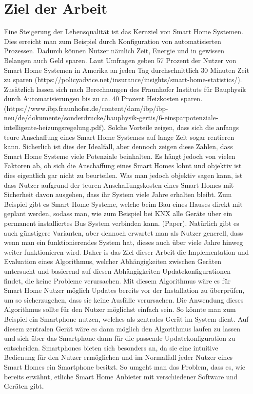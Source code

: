 \section{Ziel der Arbeit}


Eine Steigerung der Lebensqualität ist das Kernziel von Smart Home Systemen. Dies erreicht man zum Beispiel durch Konfiguration von 
automatisierten Prozessen. Dadurch können Nutzer nämlich Zeit, Energie und in gewissen Belangen auch Geld sparen. Laut Umfragen geben 57 Prozent der Nutzer von
Smart Home Systemen in Amerika an jeden Tag durchschnittlich 30 Minuten Zeit zu sparen (https://policyadvice.net/insurance/insights/smart-home-statistics/).
Zusätzlich lassen sich nach Berechnungen des Fraunhofer Instituts für Bauphysik  durch Automatisierungen bis zu ca. 40 Prozent Heizkosten 
sparen. (https://www.ibp.fraunhofer.de/content/dam/ibp/ibp-neu/de/dokumente/sonderdrucke/bauphysik-gertis/6-einsparpotenziale-intelligente-heizungsregelung.pdf).
Solche Vorteile zeigen, dass sich die anfangs teure Anschaffung eines Smart Home Systemes auf lange Zeit sogar rentieren kann. Sicherlich 
ist dies der Idealfall, aber dennoch zeigen diese Zahlen, dass Smart Home Systeme viele Potenziale beinhalten. Es hängt jedoch von 
vielen Faktoren ab, ob sich die Anschaffung eines Smart Homes lohnt und objektiv ist dies eigentlich gar nicht zu beurteilen. Was man jedoch 
objektiv sagen kann, ist dass Nutzer aufgrund der teuren Anschaffungskosten eines Smart Homes mit Sicherheit davon ausgehen, dass 
ihr System viele Jahre erhalten bleibt. Zum Beispiel gibt es Smart Home Systeme, welche beim Bau eines Hauses direkt mit geplant werden,
sodass man, wie zum Beispiel bei KNX alle Geräte über ein permanent installiertes Bus System verbinden kann. (Paper).
Natürlich gibt es auch günstigere Varianten, aber dennoch erwartet man als Nutzer generell, dass wenn man ein funktionierendes System hat, dieses
auch über viele Jahre hinweg weiter funktionieren wird.
Daher is das Ziel dieser Arbeit die Implementation und Evaluation eines Algorithmus, welcher Abhängigkeiten zwischen Geräten 
untersucht und basierend auf diesen Abhängigkeiten Updatekonfigurationen findet, die keine Probleme verursachen.
Mit diesem Algorithmus wäre es für Smart Home Nutzer möglich Updates bereits vor der Installation zu überprüfen, um so sicherzugehen, 
dass sie keine Ausfälle verursachen. Die Anwendung dieses Algorithmus sollte für den Nutzer möglichst einfach sein. So könnte man zum 
Beispiel ein Smartphone nutzen, welches als zentrales Gerät im System dient. Auf diesem zentralen Gerät wäre es dann möglich den 
Algorithmus laufen zu lassen und sich über das Smartphone dann für die passende Updatekonfiguration zu entscheiden. Smartphones
bieten sich besonders an, da sie eine intuitive Bedienung für den Nutzer ermöglichen und im Normalfall jeder Nutzer eines Smart Homes
ein Smartphone besitzt. So umgeht man das Problem, dass es, wie bereits erwähnt, etliche Smart Home Anbieter mit verschiedener
Software und Geräten gibt. 




 

